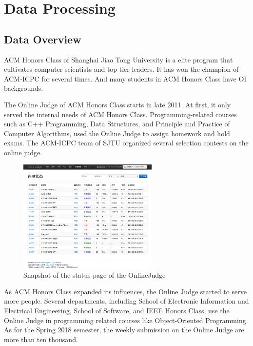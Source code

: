 
\chapter{Data Processing}


\section{Data Overview}

    ACM Honors Class\cite{acmclass} of Shanghai Jiao Tong University is a elite program
    that cultivates computer scientists and top tier leaders.
    It has won the champion of ACM-ICPC for several times.
    And many students in ACM Honors Class have OI backgrounds.

    The Online Judge\cite{acmoj} of ACM Honors Class starts in late 2011.
    At first, it only served the internal needs of ACM Honors Class.
    Programming-related courses such as C++ Programming, Data Structures,
    and Principle and Practice of Computer Algorithms,
    used the Online Judge to assign homework and hold exams.
    The ACM-ICPC team of SJTU organized several selection contests on the online judge.

    \begin{figure}[htp]
        \centering
        \includegraphics[width=0.62\textwidth]{img/acmoj.png}
        \caption{Snapshot of the status page of the OnlineJudge}
        \label{fig:acmoj}
    \end{figure}

    As ACM Honors Class expanded its influences, the Online Judge started to serve more people.
    Several departments, including School of Electronic Information and Electrical Engineering,
    School of Software, and IEEE Honors Class, use the Online Judge in programming related courses
    like Object-Oriented Programming.
    As for the Spring 2018 semester, the weekly submission on the Online Judge are more than ten thousand.

